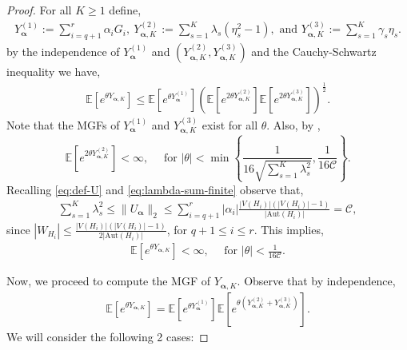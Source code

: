 \documentclass[11pt,reqno]{amsart}
\numberwithin{equation}{section}
\theoremstyle{definition}
\begin{document}
\begin{proof} 
For all $K \geq 1$ define,
\begin{align}\label{eq:YK}
    Y_{\bm \alpha}^{(1)} := \sum_{i=q+1}^{r}\alpha_{i}G_{i}, ~Y_{\bm \alpha, K}^{(2)} := \sum_{s=1}^{K}\lambda_{s}(\eta_{s}^{2}-1), \text{ and }  Y_{\bm \alpha, K}^{(3)} := \sum_{s=1}^{K} \gamma_s \eta_{s}.
\end{align}
 by the independence of $Y_{\bm \alpha}^{(1)}$ and $(Y_{\bm \alpha, K}^{(2)}, Y_{\bm \alpha, K}^{(3)})$ and the Cauchy-Schwartz inequality we have,
\begin{align*}
    \mathbb{E}\left[ e^{\theta Y_{\bm \alpha, K}} \right] \leq  \mathbb{E}\left[ e^{\theta Y_{\bm \alpha}^{(1)}} \right] \left( \mathbb{E}\left[ e^{ 2 \theta Y_{\bm \alpha, K}^{(2)}} \right]  \mathbb{E}\left[  e^{2 \theta Y_{\bm \alpha, K}^{(3)}} \right]  \right)^{\frac{1}{2}} . 
\end{align*}
Note that the MGFs of $Y_{\bm \alpha}^{(1)}$ and $Y_{\bm \alpha, K}^{(3)}$ exist for all $\theta$. Also, by \cite[Theorem 2.2]{hladky2019limit}, 
$$\mathbb{E}\left[ e^{ 2 \theta Y_{\bm \alpha, K}^{(2)}} \right] < \infty, \quad \text{ for $| \theta |<\min\left\{\frac{1}{16\sqrt{\sum_{s=1}^{K}\lambda_{s}^{2}}},\frac{1}{16\mathcal{C}}\right\}$}. 
$$
Recalling \eqref{eq:def-U} and \eqref{eq:lambda-sum-finite} observe that, 
\begin{align*}
\sum_{s=1}^{K}\lambda_{s}^{2} \leq \| U_{\bm \alpha}\|_2 \leq  \sum_{i=q+1}^{r}|\alpha_{i}| \frac{|V(H_{i})| ( |V(H_i)| -1 ) }{ |\text{Aut}(H_{i})|}  = \mathcal{C} , 
\end{align*}
since $|W_{H_{i}}|\leq \frac{|V(H_{i})| ( |V(H_i)| -1 ) }{2 |\text{Aut}(H_{i})|}$, for $q+1 \leq i \leq r$. 
This implies, 
\begin{align*}
    \mathbb{E}\left[ e^{\theta Y_{\bm \alpha, K}} \right] < \infty , \quad \text{ for }| \theta |<\frac{1}{16\mathcal{C}}.
\end{align*} 


Now, we proceed to compute the MGF of $Y_{\bm \alpha, K}$. Observe that by independence, 
\begin{align}\label{eq:MGF-YN-1-2}
    \mathbb{E}\left[ e^{\theta Y_{\bm \alpha, K} } \right] = \mathbb{E}\left[ e^{\theta Y_{\bm \alpha}^{(1)} } \right] \mathbb{E}\left[ e^{ \theta (Y_{\bm \alpha, K}^{(2)} + Y_{\bm \alpha, K}^{(3)} ) } \right] . 
\end{align} 
We will consider the following 2 cases: 


\end{proof}
\end{document}
